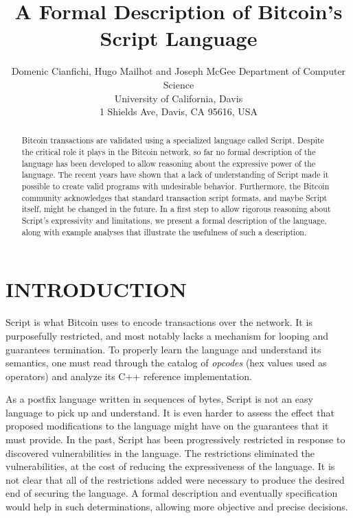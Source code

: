 \documentclass[letterpaper, 10 pt, conference]{ieeeconf}
\title{\LARGE \bf
A Formal Description of Bitcoin's Script Language
}
\author{ \parbox{4 in}{
                        \centering Domenic Cianfichi, Hugo Mailhot and Joseph McGee
                        Department of Computer Science\\
                        University of California, Davis\\
                        1 Shields Ave, Davis, CA 95616, USA
                      }
}
\begin{document}
\maketitle
\thispagestyle{empty}
\pagestyle{empty}


\begin{abstract}

Bitcoin transactions are validated using a specialized language called Script. Despite the critical role it plays in the Bitcoin network, so far no formal description of the language has been developed to allow reasoning about the expressive power of the language. The recent years have shown that a lack of understanding of Script made it possible to create valid programs with undesirable behavior. Furthermore, the Bitcoin community acknowledges that standard transaction script formats, and maybe Script itself, might be changed in the future. In a first step to allow rigorous reasoning about Script's expressivity and limitations, we present a formal description of the language, along with example analyses that illustrate the usefulness of such a description.

\end{abstract}


\section{INTRODUCTION}

Script is what Bitcoin uses to encode transactions over the network. It is purposefully restricted, and most notably lacks a mechanism for looping and guarantees termination. To properly learn the language and understand its semantics, one must read through the catalog of \textit{opcodes} (hex values used as operators) and analyze its C++ reference implementation.

As a postfix language written in sequences of bytes, Script is not an easy language to pick up and understand. It is even harder to assess the effect that proposed modifications to the language might have on the guarantees that it must provide. In the past, Script has been progressively restricted in response to discovered vulnerabilities in the language. The restrictions eliminated the vulnerabilities, at the cost of reducing the expressiveness of the language. It is not clear that all of the restrictions added were necessary to produce the desired end of securing the language. A formal description and eventually specification would help in such determinations, allowing more objective and precise decisions.
\end{document}
